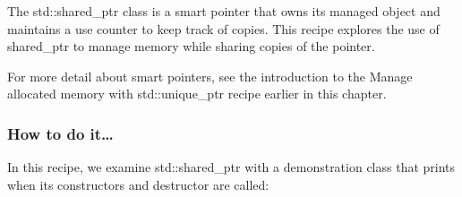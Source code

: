 
The std::shared\_ptr class is a smart pointer that owns its managed object and maintains a use counter to keep track of copies. This recipe explores the use of shared\_ptr to manage memory while sharing copies of the pointer.

\begin{tcolorbox}[colback=webgreen!5!white,colframe=webgreen!75!black,title=Note]
For more detail about smart pointers, see the introduction to the Manage allocated memory with std::unique\_ptr recipe earlier in this chapter.
\end{tcolorbox}

\subsubsection{How to do it…}

In this recipe, we examine std::shared\_ptr with a demonstration class that prints when its constructors and destructor are called:


